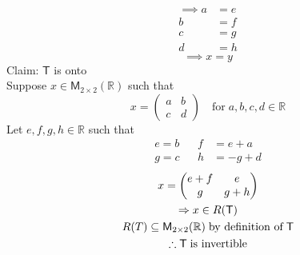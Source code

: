 \begin{enumerate}[(a)]
\begin{align}
\end{align}
\begin{align}
\implies a &= e\\
b &= f\\
c &= g\\
d &= h
\end{align}
\begin{equation}
\implies x=y
\end{equation}
Claim: $\mathsf{T}$ is onto
\\Suppose $x\in\mathsf{M}_{2\times 2}(\mathbb{R})$ such that
\begin{equation}
x = 
\begin{pmatrix} 
a & b\\
c & d
\end{pmatrix}
\quad \text{for}\; a,b,c,d \in \mathbb{R}
\end{equation}
Let $e,f,g,h \in \mathbb{R}$ such that 
\begin{align}
e = b & & f &= e +a \\
g = c & & h &= -g +d
\end{align}
\begin{gather}
x =
\begin{pmatrix}
e +f & e\\
g & g + h
\end{pmatrix}\\
\implies x \in R(\mathsf{T})\\
R(T) \subseteq \mathsf{M}_{2\times 2}(\mathbb{R})\; \text{by definition
  of}\; \mathsf{T}\\
\notag \therefore \mathsf{T}\; \text{is invertible}
\end{gather}
\end{enumerate}
